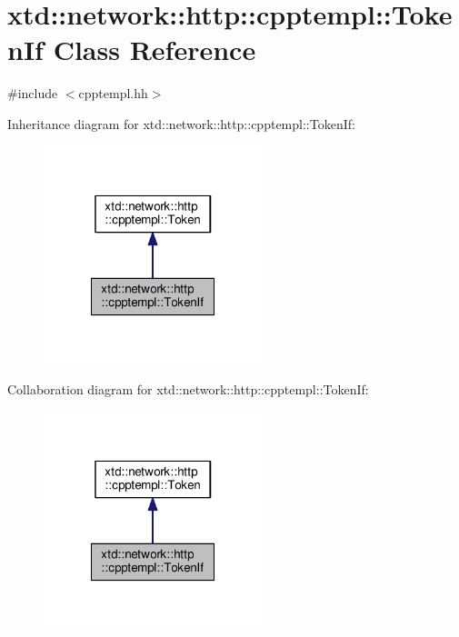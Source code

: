 \hypertarget{classxtd_1_1network_1_1http_1_1cpptempl_1_1TokenIf}{\section{xtd\-:\-:network\-:\-:http\-:\-:cpptempl\-:\-:Token\-If Class Reference}
\label{classxtd_1_1network_1_1http_1_1cpptempl_1_1TokenIf}
}


{\ttfamily \#include $<$cpptempl.\-hh$>$}



Inheritance diagram for xtd\-:\-:network\-:\-:http\-:\-:cpptempl\-:\-:Token\-If\-:
\nopagebreak
\begin{figure}[H]
\begin{center}
\leavevmode
\includegraphics[width=180pt]{classxtd_1_1network_1_1http_1_1cpptempl_1_1TokenIf__inherit__graph}
\end{center}
\end{figure}


Collaboration diagram for xtd\-:\-:network\-:\-:http\-:\-:cpptempl\-:\-:Token\-If\-:
\nopagebreak
\begin{figure}[H]
\begin{center}
\leavevmode
\includegraphics[width=180pt]{classxtd_1_1network_1_1http_1_1cpptempl_1_1TokenIf__coll__graph}
\end{center}
\end{figure}
